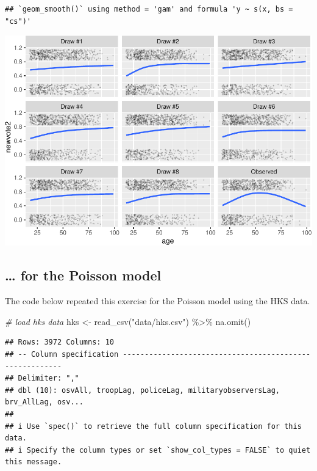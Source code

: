 \documentclass[
]{book}
\newenvironment{Shaded}{\begin{snugshade}}{\end{snugshade}}
\newcommand{\CommentTok}[1]{\textcolor[rgb]{0.56,0.35,0.01}{\textit{#1}}}
\newcommand{\FunctionTok}[1]{\textcolor[rgb]{0.00,0.00,0.00}{#1}}
\newcommand{\NormalTok}[1]{#1}
\newcommand{\OtherTok}[1]{\textcolor[rgb]{0.56,0.35,0.01}{#1}}
\newcommand{\SpecialCharTok}[1]{\textcolor[rgb]{0.00,0.00,0.00}{#1}}
\newcommand{\StringTok}[1]{\textcolor[rgb]{0.31,0.60,0.02}{#1}}
\begin{document}
\begin{verbatim}
## `geom_smooth()` using method = 'gam' and formula 'y ~ s(x, bs = "cs")'
\end{verbatim}

\includegraphics{03-04-predictive-distributions_files/figure-latex/unnamed-chunk-5-1.pdf}

\hypertarget{for-the-poisson-model}{%
\subsection{\ldots{} for the Poisson
model}\label{for-the-poisson-model}}

The code below repeated this exercise for the Poisson model using the
HKS data.

\begin{Shaded}
\begin{Highlighting}[]
\CommentTok{\# load hks data}
\NormalTok{hks }\OtherTok{\textless{}{-}} \FunctionTok{read\_csv}\NormalTok{(}\StringTok{"data/hks.csv"}\NormalTok{) }\SpecialCharTok{\%\textgreater{}\%}
  \FunctionTok{na.omit}\NormalTok{()}
\end{Highlighting}
\end{Shaded}

\begin{verbatim}
## Rows: 3972 Columns: 10
## -- Column specification --------------------------------------------------------
## Delimiter: ","
## dbl (10): osvAll, troopLag, policeLag, militaryobserversLag, brv_AllLag, osv...
## 
## i Use `spec()` to retrieve the full column specification for this data.
## i Specify the column types or set `show_col_types = FALSE` to quiet this message.
\end{verbatim}
\end{document}
